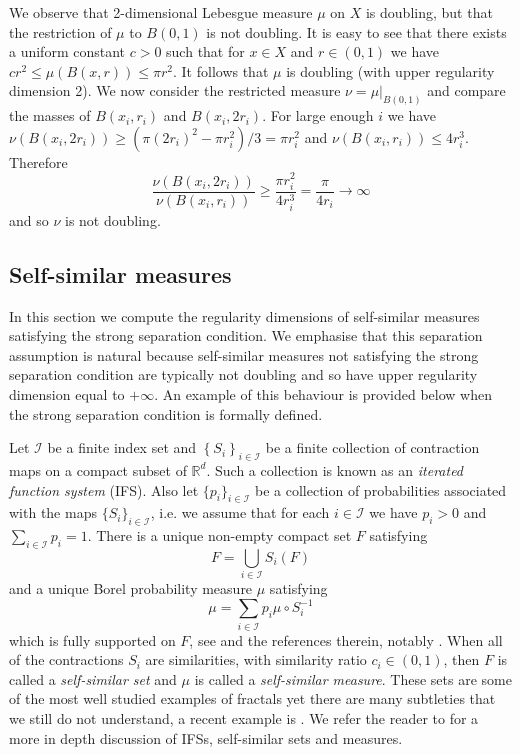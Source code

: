 We observe  that 2-dimensional Lebesgue measure $\mu$ on $X$ is doubling, but that the restriction of $\mu$ to $B(0,1)$ is not doubling.  It is easy to see that there exists a uniform constant $c>0$ such that for $x \in X$ and $r\in (0,1)$ we have $cr^2 \leq \mu(B(x,r)) \leq \pi r^2$.  It follows that $\mu$ is doubling (with upper regularity dimension 2).  We now consider the restricted measure $\nu = \mu \vert_{B(0,1)}$ and compare the masses of $B(x_i,r_i)$ and $B(x_i,2r_i)$. For large enough $i$ we have $\nu (B(x_i,2r_i)) \ge (\pi (2r_i)^2-\pi r_i^2)/3 = \pi r_i^2$  and $\nu (B(x_i,r_i)) \le 4 r_i^3$. Therefore
\[
\frac{\nu(B(x_i,2r_i))}{\nu(B(x_i,r_i))} \ge \frac{\pi r_i^2}{4r_i^3} =  \frac{\pi}{4r_i} \to \infty
\]
and so  $\nu$ is not doubling.


\subsection{Self-similar measures}\label{ch-upper-reg:sec:self-similarresult}

In this section we compute the regularity dimensions of self-similar measures satisfying the strong separation condition. We emphasise that this separation assumption is natural because self-similar measures not satisfying the strong separation condition are typically not doubling and so have upper regularity dimension equal to $+\infty$. An example of this behaviour is provided below when the strong separation condition is formally defined. 

Let  $\mathcal{I}$ be a finite index set and $\left\{S_i \right\}_{i \in \mathcal{I}}$ be a finite collection of  contraction maps on a compact subset of $\mathbb{R}^d$.  Such a collection is known as an \textit{iterated function system} (IFS).  Also let $\{p_i\}_{i \in \mathcal{I}}$ be a collection of probabilities associated with the maps $\{S_i\}_{i \in \mathcal{I}}$, i.e. we assume that for each $i \in \mathcal{I}$ we have $p_i>0$ and $\sum_{i \in \mathcal{I}} p_i = 1$. There is a  unique non-empty compact set $F$ satisfying 
\[
F=\displaystyle\bigcup_{i\in \mathcal{I}} S_i(F)
\]
and  a unique Borel probability measure $\mu$ satisfying
\[
\mu = \sum_{i \in \mathcal{I}} p_i \mu \circ S_i^{-1}
\]
which is fully supported on $F$, see \cite[Chapter 9]{falconer} and the references therein, notably \cite{hutchinson}. When all of the contractions $S_i$ are similarities, with similarity ratio $c_i \in \left(0,1 \right)$, then $F$ is called a \emph{self-similar set} and $\mu$ is called a \emph{self-similar measure}. These sets are some of the most well studied examples of fractals yet there are many subtleties that we still do not understand, a recent example is \cite{baker}. We refer the reader to \cite{falconer} for a more in depth discussion of IFSs, self-similar sets and measures.

